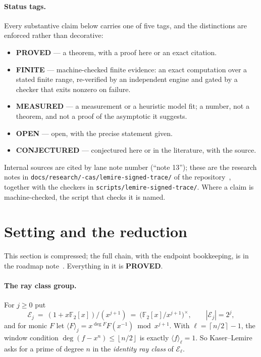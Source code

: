\documentclass[10pt]{article}
\theoremstyle{plain}
\theoremstyle{definition}
\newcommand{\F}{\mathbb F}
\newcommand{\E}{\mathcal E}
\newcommand{\ceil}[1]{\left\lceil #1\right\rceil}
\newcommand{\flr}[1]{\left\lfloor #1\right\rfloor}
\newcommand{\proved}{\textcolor{proved}{\textsf{\textbf{\footnotesize PROVED}}}}
\newcommand{\finite}{\textcolor{finite}{\textsf{\textbf{\footnotesize FINITE}}}}
\newcommand{\measuredst}{\textcolor{measured}{\textsf{\textbf{\footnotesize MEASURED}}}}
\newcommand{\openstatus}{\textcolor{open}{\textsf{\textbf{\footnotesize OPEN}}}}
\newcommand{\conj}{\textcolor{conjc}{\textsf{\textbf{\footnotesize CONJECTURED}}}}
\begin{document}
\paragraph{Status tags.} Every substantive claim below carries one of five
tags, and the distinctions are enforced rather than decorative:
\begin{itemize}
\item \proved{} --- a theorem, with a proof here or an exact citation.
\item \finite{} --- machine-checked finite evidence: an exact computation over
  a stated finite range, re-verified by an independent engine and gated by a
  checker that exits nonzero on failure.
\item \measuredst{} --- a measurement or a heuristic model fit; a number, not a
  theorem, and not a proof of the asymptotic it suggests.
\item \openstatus{} --- open, with the precise statement given.
\item \conj{} --- conjectured here or in the literature, with the source.
\end{itemize}
Internal sources are cited by lane note number (``note 13''); these are the
research notes in \texttt{docs/\allowbreak research/-cas/\allowbreak lemire-signed-trace/} of the
repository~\cite{ledger}, together with the checkers in
\texttt{scripts/lemire-signed-trace/}. Where a claim is machine-checked, the
script that checks it is named.


\section{Setting and the reduction}\label{sec:setting}

This section is compressed; the full chain, with the endpoint bookkeeping, is
in the roadmap note~\cite{roadmap}. Everything in it is \proved.

\paragraph{The ray class group.} For $j\ge0$ put
\[
 \E_j\ =\ (1+x\F_2[x])/(x^{j+1})\ =\ \bigl(\F_2[x]/x^{j+1}\bigr)^{\times},
 \qquad |\E_j|=2^{j},
\]
and for monic $F$ let $\langle F\rangle_j=x^{\deg F}F(x^{-1})\bmod x^{j+1}$.
With $\ell=\ceil{n/2}-1$, the window condition $\deg(f-x^n)\le\flr{n/2}$ is
exactly $\langle f\rangle_\ell=1$. So Kaser--Lemire asks for a prime of degree
$n$ in the \emph{identity ray class} of $\E_\ell$.
\end{document}
